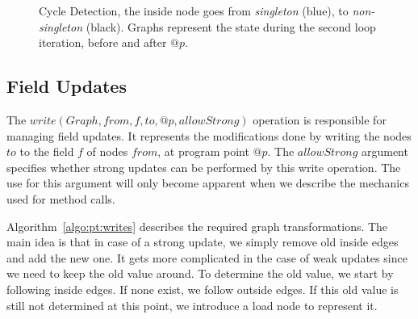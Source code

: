 \begin{figure}[h]
\begin{minipage}[tr]{0.7\linewidth}
\end{minipage}
    \caption{Cycle Detection, the inside node goes from \emph{singleton}
    (blue), to \emph{non-singleton} (black). Graphs represent the state during the
    second loop iteration, before and after $@p$.}
    \label{fig:pt:alloccycle}
\end{figure}


\subsection{Field Updates}
The $write(Graph, from, f, to, @p, allowStrong)$ operation is responsible for
managing field updates. It represents the modifications done by writing the nodes $to$ to
the field $f$ of nodes $from$, at program point $@p$. The $allowStrong$
argument specifies whether strong updates can be performed by this write
operation. The use for this argument will only become apparent when we 
describe the mechanics used for method calls.

Algorithm~\ref{algo:pt:writes} describes the required graph transformations.
The main idea is that in case of a strong update, we simply remove old inside
edges and add the new one. It gets more complicated in the case of weak updates
since we need to keep the old value around. To determine the old value, we start
by following inside edges. If none exist, we follow outside edges. If this old
value is still not determined at this point, we introduce a load node to
represent it.

